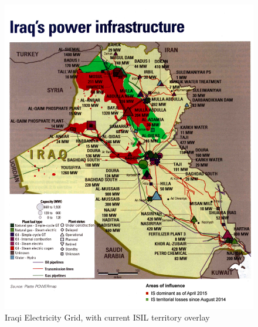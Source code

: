 \documentclass{report}
\begin{document}
\begin{figure}[H]
 \centering
 \includegraphics[trim = 0cm 0cm 0cm 0cm, clip,scale=.3]{./figures/elec_grid2.png}
   \caption{Iraqi Electricity Grid, with current ISIL territory overlay \cite{GlobalEnergyNetworkInstitute}}
     \label{fig:elec_grid}
\end{figure}
\end{document}
